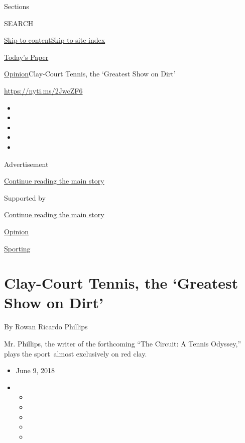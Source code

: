 Sections

SEARCH

\protect\hyperlink{site-content}{Skip to
content}\protect\hyperlink{site-index}{Skip to site index}

\href{https://myaccount.nytimes.com/auth/login?response_type=cookie\&client_id=vi}{}

\href{https://www.nytimes.com/section/todayspaper}{Today's Paper}

\href{/section/opinion}{Opinion}\textbar{}Clay-Court Tennis, the
`Greatest Show on Dirt'

\href{https://nyti.ms/2JwcZF6}{https://nyti.ms/2JwcZF6}

\begin{itemize}
\item
\item
\item
\item
\item
\end{itemize}

Advertisement

\protect\hyperlink{after-top}{Continue reading the main story}

Supported by

\protect\hyperlink{after-sponsor}{Continue reading the main story}

\href{/section/opinion}{Opinion}

\href{/column/sporting}{Sporting}

\hypertarget{clay-court-tennis-the-greatest-show-on-dirt}{%
\section{Clay-Court Tennis, the `Greatest Show on
Dirt'}\label{clay-court-tennis-the-greatest-show-on-dirt}}

By Rowan Ricardo Phillips

Mr. Phillips, the writer of the forthcoming ``The Circuit: A Tennis
Odyssey,'' plays the sport~almost exclusively on red clay.

\begin{itemize}
\item
  June 9, 2018
\item
  \begin{itemize}
  \item
  \item
  \item
  \item
  \item
  \end{itemize}
\end{itemize}

